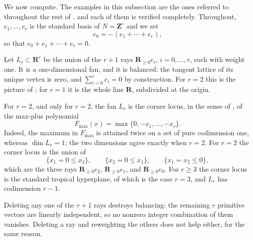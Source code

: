 We now compute.  The examples in this subsection are the ones referred to
throughout the rest of , and each of them is verified
completely.  Throughout, $e_1,\ldots,e_r$ is the standard basis of
$N=\mathbf Z^r$ and we set
\[
                 e_0=-(e_1+\cdots+e_r),
\]
so that $e_0+e_1+\cdots+e_r=0$.

\begin{example}
\label{ex:ch10-standard-line}
Let $L_r\subset\mathbf R^r$ be the union of the $r+1$ rays
$\mathbf R_{\geq0}e_i$, $i=0,\ldots,r$, each with weight one.  It is a
one-dimensional fan, and it is balanced: the tangent lattice of its unique
vertex is zero, and $\sum_{i=0}^re_i=0$ by construction.  For $r=2$ this is
the picture of ; for $r=1$ it is the whole
line $\mathbf R$, subdivided at the origin.

For $r=2$, and only for $r=2$, the fan $L_r$ is the corner locus, in the
sense of , of the max-plus polynomial
\[
 F_{\max}(x)=\max\{0,-x_1,\ldots,-x_r\}.
\]
Indeed, the maximum in $F_{\max}$ is attained twice on a set of pure
codimension one, whereas $\dim L_r=1$; the two dimensions agree exactly when
$r=2$.  For $r=2$ the corner locus is the union of
\[
 \{x_1=0\leq x_2\},\qquad
 \{x_2=0\leq x_1\},\qquad
 \{x_1=x_2\leq0\},
\]
which are the three rays $\mathbf R_{\geq0}e_2$,
$\mathbf R_{\geq0}e_1$, and $\mathbf R_{\geq0}e_0$.  For $r\geq3$ the corner
locus is the standard tropical hyperplane, of which
 is the case $r=3$, and $L_r$ has codimension
$r-1$.

Deleting any one of the $r+1$ rays destroys balancing: the remaining $r$
primitive vectors are linearly independent, so no nonzero integer
combination of them vanishes.  Deleting a ray and reweighting the others
does not help either, for the same reason.
\end{example}

